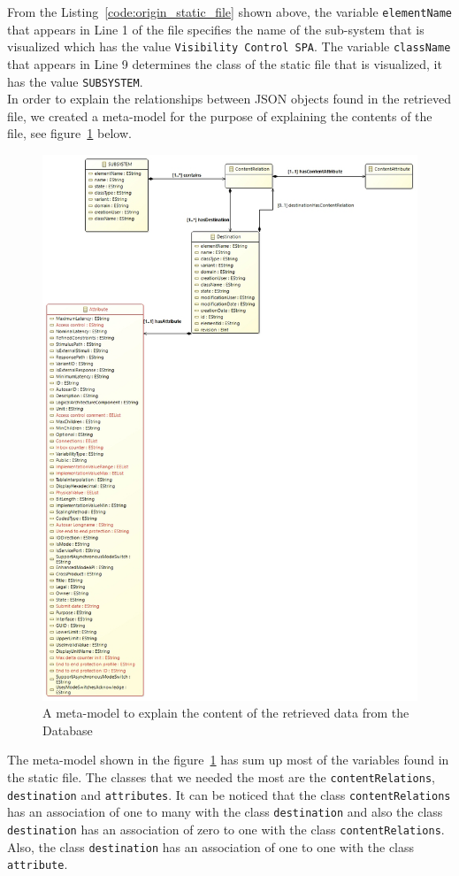 From the Listing~\ref{code:origin_static_file} shown above, the variable \texttt{elementName} that appears in Line 1 of the file specifies the name of the sub-system that is visualized which has the value \texttt{Visibility Control SPA}. The variable \texttt{className} that appears in Line 9 determines the class of the static file that is visualized, it has the value \texttt{SUBSYSTEM}. \\

In order to explain the relationships between JSON objects found in the retrieved file, we created a meta-model for the purpose of explaining the contents of the file, see figure~\ref{fig:old_metamodel} below.

\begin{figure}[H]
\centering
\captionsetup{justification=centering}
\vspace{0cm}%
\includegraphics[width=0.45\linewidth]{figure/new_model/Old_Metamodel.jpg}
\caption{A meta-model to explain the content of the retrieved data from the Database}
\label{fig:old_metamodel}
\end{figure}

The meta-model shown in the figure~\ref{fig:old_metamodel} has sum up most of the variables found in the static file. The classes that we needed the most are the \texttt{contentRelations}, \texttt{destination} and \texttt{attributes}. It can be noticed that the class \texttt{contentRelations} has an association of one to many with the class \texttt{destination} and also the class \texttt{destination} has an association of zero to one with the class \texttt{contentRelations}. Also, the class \texttt{destination} has an association of one to one with the class \texttt{attribute}. \\


